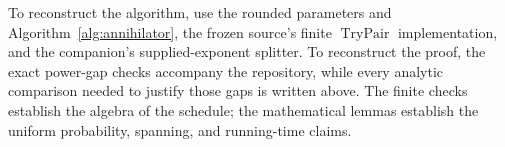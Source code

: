 To reconstruct the algorithm, use the rounded parameters and
Algorithm~\ref{alg:annihilator}, the frozen source's finite
\(\operatorname{TryPair}\) implementation, and the companion's
supplied-exponent splitter.  To reconstruct the proof, the exact
power-gap checks accompany the repository, while every analytic
comparison needed to justify those gaps is written above.  The
finite checks establish the algebra of the schedule; the mathematical
lemmas establish the uniform probability, spanning, and running-time
claims.
